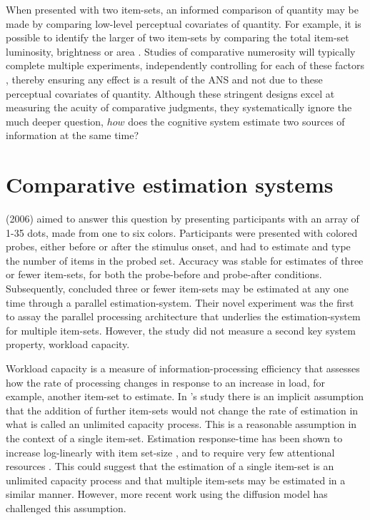When presented with two item-sets, an informed comparison of quantity may be made by comparing low-level perceptual covariates of quantity. For example, it is possible to identify the larger of two item-sets by comparing the total item-set luminosity, brightness or area \cite{HALBERDA_2006}. Studies of comparative numerosity will typically complete multiple experiments, independently controlling for each of these factors \cite{inglis2014}, thereby ensuring any effect is a result of the ANS and not due to these perceptual covariates of quantity. Although these stringent designs excel at measuring the acuity of comparative judgments, they systematically ignore the much deeper question, $how$ does the cognitive system estimate two sources of information at the same time?

\section{Comparative estimation systems}
\citeauthor{HALBERDA_2006} (2006) aimed to answer this question by presenting participants with an array of 1-35 dots, made from one to six colors. Participants were presented with colored probes, either before or after the stimulus onset, and had to estimate and type the number of items in the probed set. Accuracy was stable for estimates of three or fewer item-sets, for both the probe-before and probe-after conditions. Subsequently, \citeauthor{HALBERDA_2006} concluded three or fewer item-sets may be estimated at any one time through a parallel estimation-system. Their novel experiment was the first to assay the parallel processing architecture that underlies the estimation-system for multiple item-sets. However, the study did not measure a second key system property, workload capacity. 

Workload capacity is a measure of information-processing efficiency that assesses how the rate of processing changes in response to an increase in load, for example, another item-set to estimate. In \citeauthor{HALBERDA_2006}'s study there is an implicit assumption that the addition of further item-sets would not change the rate of estimation in what is called an unlimited capacity process. This is a reasonable assumption in the context of a single item-set. Estimation response-time has been shown to increase log-linearly with item set-size \cite{Whalen1999}, and to require very few attentional resources \cite{Burr2010}. This could suggest that the estimation of a single item-set is an unlimited capacity process and that multiple item-sets may be estimated in a similar manner. However, more recent work using the diffusion model has challenged this assumption. 

